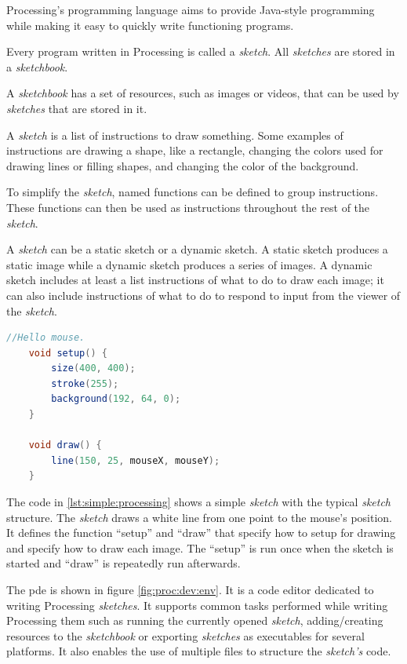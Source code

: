 \documentclass{./llncs2e/llncs}
\begin{document}
	Processing's programming language aims to provide Java-style programming while making it easy to quickly write functioning programs. 

	Every program written in Processing is called a \emph{sketch}. 
	All \emph{sketches} are stored in a \emph{sketchbook}.

	A \emph{sketchbook} has a set of resources, such as images or videos, that can be used by \emph{sketches} that are stored in it.

	A \emph{sketch} is a list of instructions to draw something. 
	Some examples of instructions are drawing a shape, like a rectangle, changing the colors used for drawing lines or filling shapes, and changing the color of the background.

	To simplify the \emph{sketch}, named functions can be defined to group instructions. 
	These functions can then be used as instructions throughout the rest of the \emph{sketch}.

	A \emph{sketch} can be a static sketch or a dynamic sketch. 
	A static sketch produces a static image while a dynamic sketch produces a series of images. 
	A dynamic sketch includes at least a list instructions of what to do to draw each image; it can also include instructions of what to do to respond to input from the viewer of the \emph{sketch}.

	\begin{lstlisting}[caption={A simple Processing sketch},label={lst:simple:processing},language=Java]
	//Hello mouse.
	void setup() {
	    size(400, 400);
	    stroke(255);
	    background(192, 64, 0);
	}
	 
	void draw() {
	    line(150, 25, mouseX, mouseY);
	}
	\end{lstlisting}

	The code in \ref{lst:simple:processing} shows a simple \emph{sketch} with the typical \emph{sketch} structure. 
	The \emph{sketch} draws a white line from one point to the mouse's position. 
	It defines the function ``setup'' and  ``draw'' that specify how to setup for drawing and specify how to draw each image. 
	The ``setup'' is run once when the sketch is started and ``draw'' is repeatedly run afterwards.

	The \ac{pde} is shown in figure \ref{fig:proc:dev:env}. 
	It is a code editor dedicated to writing Processing \emph{sketches}. 
	It supports common tasks performed while writing Processing them such as running the currently opened \emph{sketch}, adding/creating resources to the \emph{sketchbook} or exporting \emph{sketches} as executables for several platforms. 
	It also enables the use of multiple files to structure the \emph{sketch's} code.
\end{document}
